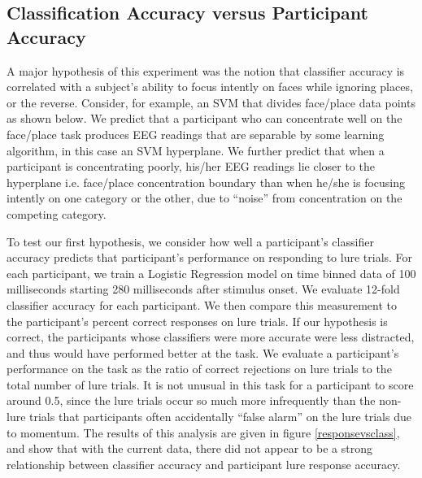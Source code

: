 \documentclass[11pt]{report}
\begin{document}
\subsection{Classification Accuracy versus Participant Accuracy}

A major hypothesis of this experiment was the notion that classifier accuracy is correlated with a subject's ability to focus intently on faces while ignoring places, or the reverse.  Consider, for example, an SVM that divides face/place data points as shown below.  We predict that a participant who can concentrate well on the face/place task produces EEG readings that are separable by some learning algorithm, in this case an SVM hyperplane.  We further predict that when a participant is concentrating poorly, his/her EEG readings lie closer to the hyperplane i.e. face/place concentration boundary than when he/she is focusing intently on one category or the other, due to ``noise'' from concentration on the competing category. 

To test our first hypothesis, we consider how well a participant's classifier accuracy predicts that participant's performance on responding to lure trials.  For each participant, we train a Logistic Regression model on time binned data of 100 milliseconds starting 280 milliseconds after stimulus onset.  We evaluate 12-fold classifier accuracy for each participant.  We then compare this measurement to the participant's percent correct responses on lure trials.  If our hypothesis is correct, the participants whose classifiers were more accurate were less distracted, and thus would have performed better at the task.  We evaluate a participant's performance on the task as the ratio of correct rejections on lure trials to the total number of lure trials.  It is not unusual in this task for a participant to score around 0.5, since the lure trials occur so much more infrequently than the non-lure trials that participants often accidentally ``false alarm'' on the lure trials due to momentum.  The results of this analysis are given in figure \ref{responsevsclass}, and show that with the current data, there did not appear to be a strong relationship between classifier accuracy and participant lure response accuracy.
\end{document}
